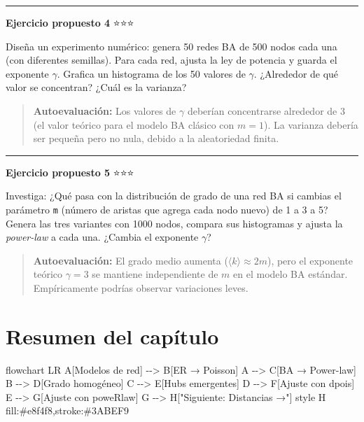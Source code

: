 \documentclass[
  letterpaper,
  DIV=11,
  numbers=noendperiod]{scrreprt}
\newenvironment{Shaded}{\begin{snugshade}}{\end{snugshade}}
\newcommand{\NormalTok}[1]{\textcolor[rgb]{0.00,0.23,0.31}{#1}}
\begin{document}
\begin{center}\rule{0.5\linewidth}{0.5pt}\end{center}

\textbf{Ejercicio propuesto 4} ⭐⭐⭐

Diseña un experimento numérico: genera 50 redes BA de 500 nodos cada una
(con diferentes semillas). Para cada red, ajusta la ley de potencia y
guarda el exponente \(\gamma\). Grafica un histograma de los 50 valores
de \(\gamma\). ¿Alrededor de qué valor se concentran? ¿Cuál es la
varianza?

\begin{quote}
\textbf{Autoevaluación:} Los valores de \(\gamma\) deberían concentrarse
alrededor de 3 (el valor teórico para el modelo BA clásico con
\(m = 1\)). La varianza debería ser pequeña pero no nula, debido a la
aleatoriedad finita.
\end{quote}

\begin{center}\rule{0.5\linewidth}{0.5pt}\end{center}

\textbf{Ejercicio propuesto 5} ⭐⭐⭐

Investiga: ¿Qué pasa con la distribución de grado de una red BA si
cambias el parámetro \texttt{m} (número de aristas que agrega cada nodo
nuevo) de 1 a 3 a 5? Genera las tres variantes con 1000 nodos, compara
sus histogramas y ajusta la \emph{power-law} a cada una. ¿Cambia el
exponente \(\gamma\)?

\begin{quote}
\textbf{Autoevaluación:} El grado medio aumenta
(\(\langle k \rangle \approx 2m\)), pero el exponente teórico
\(\gamma = 3\) se mantiene independiente de \(m\) en el modelo BA
estándar. Empíricamente podrías observar variaciones leves.
\end{quote}

\section{Resumen del capítulo}\label{resumen-del-capuxedtulo-1}

\begin{Shaded}
\begin{Highlighting}[]
\NormalTok{flowchart LR}
\NormalTok{    A[Modelos de red] {-}{-}\textgreater{} B[ER → Poisson]}
\NormalTok{    A {-}{-}\textgreater{} C[BA → Power{-}law]}
\NormalTok{    B {-}{-}\textgreater{} D[Grado homogéneo]}
\NormalTok{    C {-}{-}\textgreater{} E[Hubs emergentes]}
\NormalTok{    D {-}{-}\textgreater{} F[Ajuste con dpois]}
\NormalTok{    E {-}{-}\textgreater{} G[Ajuste con poweRlaw]}
\NormalTok{    G {-}{-}\textgreater{} H["Siguiente: Distancias →"]}
\NormalTok{    style H fill:\#e8f4f8,stroke:\#3ABEF9}
\end{Highlighting}
\end{Shaded}
\end{document}
